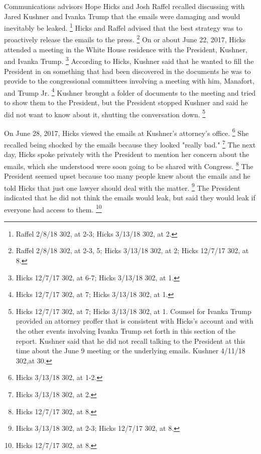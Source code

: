 {Communications advisors Hope Hicks and Josh Raffel recalled discussing with Jared Kushner and Ivanka Trump that the emails were damaging and would inevitably be leaked.%
\footnote{Raffel 2/8/18 302, at 2-3;
Hicks 3/13/18 302, at 2.}
Hicks and Raffel advised that the best strategy was to proactively release the emails to the press.%
\footnote{Raffel 2/8/18 302, at 2-3, 5;
Hicks 3/13/18 302, at 2;
Hicks 12/7/17 302, at 8.}
On or about June 22, 2017, Hicks attended a meeting in the White House residence with the President, Kushner, and Ivanka Trump.%
\footnote{Hicks 12/7/17 302, at 6-7;
Hicks 3/13/18 302, at 1.}
According to Hicks, Kushner said that he wanted to fill the President in on something that had been discovered in the documents he was to provide to the congressional committees involving a meeting with him, Manafort, and Trump Jr.%
\footnote{Hicks 12/7/17 302, at 7;
Hicks 3/13/18 302, at 1.}
Kushner brought a folder of documents to the meeting and tried to show them to the President, but the President stopped Kushner and said he did not want to know about it, shutting the conversation down.%
\footnote{Hicks 12/7/17 302, at 7;
Hicks 3/13/18 302, at 1.
Counsel for Ivanka Trump provided an attorney proffer that is consistent with Hicks’s account and with the other events involving Ivanka Trump set forth in this section of the report.
Kushner said that he did not recall talking to the President at this time about the June 9 meeting or the underlying emails.
Kushner 4/11/18 302,at 30.}

On June 28, 2017, Hicks viewed the emails at Kushner's attorney's office.%
\footnote{Hicks 3/13/18 302, at 1-2.}
She recalled being shocked by the emails because they looked "really bad."%
\footnote{Hicks 3/13/18 302, at 2.}
The next day, Hicks spoke privately with the President to mention her concern about the emails, which she understood were soon going to be shared with Congress.%
\footnote{Hicks 12/7/17 302, at 8.}
The President seemed upset because too many people knew about the emails and he told Hicks that just one lawyer should deal with the matter.%
\footnote{Hicks 3/13/18 302, at 2-3;
Hicks 12/7/17 302, at 8.}
The President indicated that he did not think the emails would leak, but said they would leak if everyone had access to them.%
\footnote{Hicks 12/7/17 302, at 8.}

}
